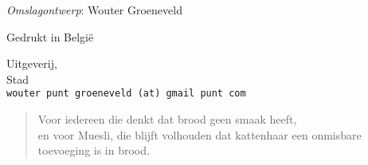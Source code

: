 \hspace*{2em} \textit{Omslagontwerp}: Wouter Groeneveld \\

\vfill

Gedrukt in België

Uitgeverij, \\
Stad \\
\texttt{wouter punt groeneveld (at) gmail punt com}

\vspace*{2\baselineskip}


\clearpage

 \newenvironment{dedication}
     {\vspace{6ex}\begin{quotation}\begin{center}\begin{em}}
     {\par\end{em}\end{center}\end{quotation}}

\begin{dedication}
	Voor iedereen die denkt dat brood geen smaak heeft, \\
	en voor Muesli, die blijft volhouden dat kattenhaar een onmisbare toevoeging is in brood. 
\end{dedication}

\endgroup
\clearpage
\pagestyle{plain}

